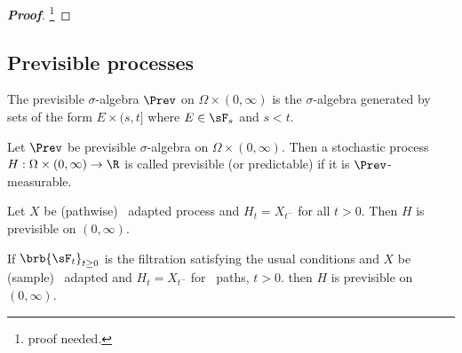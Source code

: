 \begin{proof}[\bf Proof]
\footnote{proof needed.}
\end{proof}




\subsection{Previsible processes}

\begin{definition}\label{def:previsible_sigma_algebra_without_zero}
The previsible $\sigma$-algebra $\Prev$ on $\Omega \times (0,\infty)$ is the $\sigma$-algebra generated by sets of the form $E \times(s, t]$ where $E \in \sF_s$ and $s < t$. %
\end{definition}

\begin{definition}\label{def:previsible_process_continuous_without_zero}
Let $\Prev$ be previsible $\sigma$-algebra on $\Omega \times (0,\infty)$. Then a stochastic process $H: \Omega \times (0,\infty) \to \R$ is called previsible (or predictable) if it is $\Prev$-measurable.%
\end{definition}



\begin{proposition}\label{pro:previsible}
Let $X$ be (pathwise) \cadlag\ adapted process and $H_t = X_{t^-}$ for all $t>0$. Then $H$ is previsible on $(0,\infty)$.

If $\brb{\sF_t}_{t\geq 0}$ is the filtration satisfying the usual conditions and $X$ be (sample) \cadlag\ adapted and $H_t = X_{t^-}$ for \cadlag\ paths, $t > 0$. then $H$ is previsible on $(0,\infty)$.
\end{proposition}

